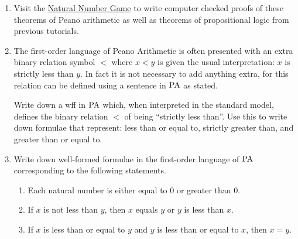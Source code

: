 \documentclass[11pt]{report}
\begin{document}
\begin{enumerate}
	\item Visit the \href{https://www.ma.imperial.ac.uk/~buzzard/xena/natural_number_game/}{Natural Number Game} to write computer checked proofs of these theorems of Peano arithmetic as well as theorems of propositional logic from previous tutorials. 
	
	\item The first-order language of Peano Arithmetic is often presented with an extra binary relation symbol $<$ where $x < y$ is given the usual interpretation: $x$ is strictly less than $y$. In fact it is not necessary to add anything extra, for this relation can be defined using a sentence in $\text{PA}$ as stated. 
	
	Write down a wff in $\text{PA}$ which, when interpreted in the standard model, defines the binary relation $<$ of being ``strictly less than''. Use this to write down formulae that represent: less than or equal to, strictly greater than, and greater than or equal to. 


	\item Write down well-formed formulae in the first-order language of $\text{PA}$ corresponding to the following statements. 
	
	\begin{enumerate}
		\item Each natural number is either equal to $0$ or greater than $0$. 			
		\item If $x$ is not less than $y$, then $x$ equals $y$ or $y$ is less than $x$.
		\item If $x$ is less than or equal to $y$ and $y$ is less than or equal to $x$, then $x=y$. 
	\end{enumerate}
	 
\end{enumerate}	
\end{document}
